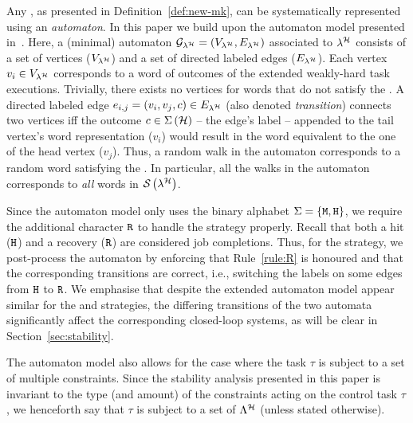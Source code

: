 Any \ewhc{}, as presented in Definition~\ref{def:new-mk}, can be systematically represented using an \emph{automaton}.
In this paper we build upon the \tool{} automaton model presented in~\cite{Vreman:2022}.
Here, a (minimal) automaton $\mathcal{G}_{\lambda^{\mathcal{H}}} = \left(V_{\lambda^{\mathcal{H}}}, E_{\lambda^{\mathcal{H}}}\right)$ associated to $\lambda^{\mathcal{H}}$ consists of a set of vertices ($V_{\lambda^{\mathcal{H}}}$) and a set of directed labeled edges ($E_{\lambda^{\mathcal{H}}}$). 
Each vertex $v_i \in V_{\lambda^{\mathcal{H}}}$ corresponds to a word of outcomes of the extended weakly-hard task executions. 
Trivially, there exists no vertices for words that do not satisfy the \ewhc{}.
A directed labeled edge $e_{i, j} = \left(v_i, v_j, c \right) \in E_{\lambda^{\mathcal{H}}}$ (also denoted \emph{transition}) connects two vertices iff the outcome $c \in \Sigma\left(\mathcal{H}\right)$ -- the edge's label -- appended to the tail vertex's word representation ($v_i$) would result in the word equivalent to the one of the head vertex ($v_j$).
Thus, a random walk in the automaton corresponds to a random word satisfying the \ewhc{}.
In particular, all the walks in the automaton corresponds to \emph{all} words in $\mathcal{S}_{}\left( \lambda^{\mathcal{H}} \right)$.

Since the \tool{} automaton model only uses the binary alphabet $\Sigma = \left\{\texttt{M}, \texttt{H}\right\}$, we require the additional character $\texttt{R}$ to handle the \tS{} strategy properly.
Recall that both a hit ($\texttt{H}$) and a recovery ($\texttt{R}$) are considered job completions.
Thus, for the \tS{} strategy, we post-process the automaton by enforcing that Rule~\ref{rule:R} is honoured and that the corresponding transitions are correct, i.e., switching the labels on some edges from $\texttt{H}$ to $\texttt{R}$. 
We emphasise that despite the extended automaton model appear similar for the \tK{} and \tS{} strategies, the differing transitions of the two automata significantly affect the corresponding closed-loop systems, as will be clear in Section~\ref{sec:stability}.

The \tool{} automaton model also allows for the case where the task $\tau$ is subject to a set of multiple constraints.
Since the stability analysis presented in this paper is invariant to the type (and amount) of the constraints acting on the control task $\tau$, we henceforth say that $\tau$ is subject to a set of \ewhc{} $\Lambda^{\mathcal{H}}$ (unless stated otherwise).


